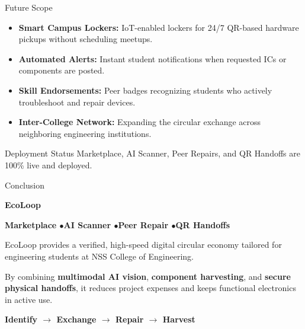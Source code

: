 \documentclass{beamer}
\begin{document}
\begin{frame}{Future Scope}

\begin{itemize}
    \setlength\itemsep{0.35cm}
    \item \textbf{Smart Campus Lockers:} IoT-enabled lockers for 24/7 QR-based hardware pickups without scheduling meetups.

    \item \textbf{Automated Alerts:} Instant student notifications when requested ICs or components are posted.

    \item \textbf{Skill Endorsements:} Peer badges recognizing students who actively troubleshoot and repair devices.

    \item \textbf{Inter-College Network:} Expanding the circular exchange across neighboring engineering institutions.
\end{itemize}

\vspace{0.2cm}
\begin{alertblock}{Deployment Status}
\small Marketplace, AI Scanner, Peer Repairs, and QR Handoffs are 100\% live and deployed.
\end{alertblock}

\end{frame}


\begin{frame}{Conclusion}

\begin{center}

{\Large \textbf{EcoLoop}}

\vspace{0.15cm}
\textbf{Marketplace \quad$\bullet$\quad AI Scanner \quad$\bullet$\quad Peer Repair \quad$\bullet$\quad QR Handoffs}

\vspace{0.35cm}
\begin{block}{}
\centering
\small
EcoLoop provides a verified, high-speed digital circular economy tailored for engineering students at NSS College of Engineering.

\vspace{0.15cm}
By combining \textbf{multimodal AI vision}, \textbf{component harvesting}, and \textbf{secure physical handoffs}, it reduces project expenses and keeps functional electronics in active use.
\end{block}

\vspace{0.25cm}
\textbf{Identify $\rightarrow$ Exchange $\rightarrow$ Repair $\rightarrow$ Harvest}

\end{center}

\end{frame}
\end{document}
